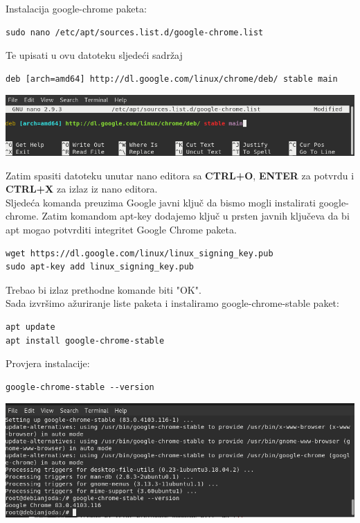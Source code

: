 \documentclass[12pt,vi]{mitthesis}
\begin{document}
\noindent
Instalacija google-chrome paketa:
\begin{lstlisting}[style=BashInputStyle]
sudo nano /etc/apt/sources.list.d/google-chrome.list
\end{lstlisting}
Te upisati u ovu datoteku sljedeći sadržaj
\begin{lstlisting}[style=BashInputStyle]
deb [arch=amd64] http://dl.google.com/linux/chrome/deb/ stable main
\end{lstlisting}
\includegraphics[width=\linewidth]{images/google-chrome-list.png} 

Zatim spasiti datoteku unutar nano editora sa \textbf{CTRL+O}, \textbf{ENTER} za potvrdu i \textbf{CTRL+X} za izlaz iz nano editora.\\
Sljedeća komanda preuzima Google javni ključ da bismo mogli instalirati google-chrome. Zatim komandom apt-key dodajemo ključ u prsten javnih ključeva da bi apt mogao potvrditi integritet Google Chrome paketa.\\
\begin{lstlisting}[style=BashInputStyle]
wget https://dl.google.com/linux/linux_signing_key.pub
sudo apt-key add linux_signing_key.pub
\end{lstlisting}
Trebao bi izlaz prethodne komande biti "OK".\\
\indent
Sada izvršimo ažuriranje liste paketa i instaliramo google-chrome-stable paket:
\begin{lstlisting}[style=BashInputStyle]
apt update
apt install google-chrome-stable
\end{lstlisting}

Provjera instalacije:
\begin{lstlisting}[style=BashInputStyle]
google-chrome-stable --version
\end{lstlisting}
\includegraphics[width=\linewidth]{images/googlechromestableversion.png} 
\end{document}
